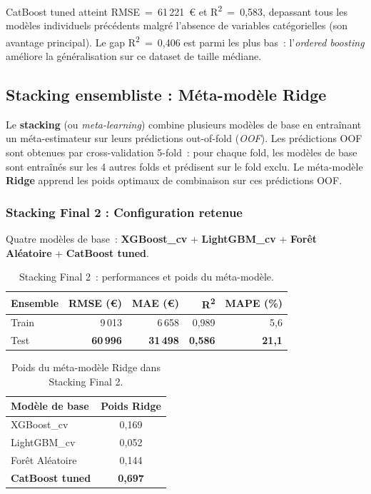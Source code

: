 \documentclass[12pt,a4paper]{article}
\begin{document}
\begin{descrbox}
CatBoost tuned atteint RMSE~=~61\,221~\euro{} et R\textsuperscript{2}~=~0{,}583, depassant tous les mod\`eles individuels pr\'ec\'edents malgr\'e l'absence de variables cat\'egorielles (son avantage principal). Le gap R\textsuperscript{2}~=~0{,}406 est parmi les plus bas~: l'\textit{ordered boosting} am\'eliore la g\'en\'eralisation sur ce dataset de taille m\'ediane.
\end{descrbox}

\subsection{Stacking ensembliste : M\'eta-mod\`ele Ridge}

Le \textbf{stacking} (ou \textit{meta-learning}) combine plusieurs mod\`eles de base en entra\^inant un m\'eta-estimateur sur leurs pr\'edictions out-of-fold (\textit{OOF}). Les pr\'edictions OOF sont obtenues par cross-validation 5-fold~: pour chaque fold, les mod\`eles de base sont entra\^in\'es sur les 4 autres folds et pr\'edisent sur le fold exclu. Le m\'eta-mod\`ele \textbf{Ridge} apprend les poids optimaux de combinaison sur ces pr\'edictions OOF.

\subsubsection{Stacking Final 2 : Configuration retenue}

Quatre mod\`eles de base~: \textbf{XGBoost\_cv} + \textbf{LightGBM\_cv} + \textbf{For\^et Al\'eatoire} + \textbf{CatBoost tuned}.

\begin{table}[H]
\centering
\caption{Stacking Final 2~: performances et poids du m\'eta-mod\`ele.}
\label{tab:stacking}
\begin{tabular}{lrrrr}
\toprule
\textbf{Ensemble} & \textbf{RMSE (\euro)} & \textbf{MAE (\euro)} & \textbf{R\textsuperscript{2}} & \textbf{MAPE (\%)} \\
\midrule
Train & 9\,013 & 6\,658 & 0{,}989 & 5{,}6 \\
Test  & \textbf{60\,996} & \textbf{31\,498} & \textbf{0{,}586} & \textbf{21{,}1} \\
\bottomrule
\end{tabular}
\end{table}

\begin{table}[H]
\centering
\caption{Poids du m\'eta-mod\`ele Ridge dans Stacking Final 2.}
\label{tab:meta_poids}
\small
\begin{tabular}{lc}
\toprule
\textbf{Mod\`ele de base} & \textbf{Poids Ridge} \\
\midrule
XGBoost\_cv   & 0{,}169 \\
LightGBM\_cv  & 0{,}052 \\
For\^et Al\'eatoire & 0{,}144 \\
\textbf{CatBoost tuned} & \textbf{0{,}697} \\
\bottomrule
\end{tabular}
\end{table}
\end{document}
